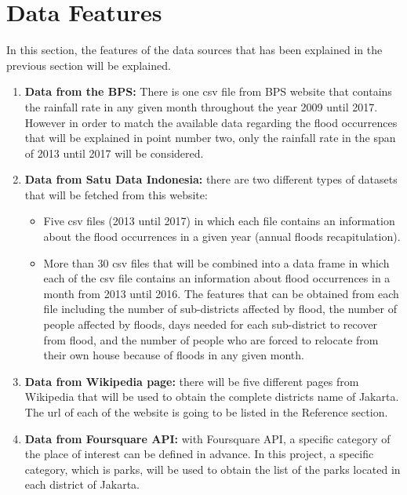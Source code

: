 \section{Data Features}
In this section, the features of the data sources that has been explained in the previous section will be explained.
\begin{enumerate}
\item \textbf{Data from the BPS:} There is one csv file from BPS website that contains the rainfall rate in any given month throughout the year 2009 until 2017. However in order to match the available data regarding the flood occurrences that will be explained in point number two, only the rainfall rate in the span of 2013 until 2017 will be considered.
\item  \textbf{Data from Satu Data Indonesia:} there are two different types of datasets that will be fetched from this website:

\begin{itemize}
\item Five csv files (2013 until 2017) in which each file contains an information about the flood occurrences in a given year (annual floods recapitulation).
\item More than 30 csv files that will be combined into a data frame in which each of the csv file contains an information about flood occurrences in a month from 2013 until 2016. The features that can be obtained from each file including the number of sub-districts affected by flood, the number of people affected by floods, days needed for each sub-district to recover from flood, and the number of people who are forced to relocate from their own house because of floods in any given month.
\end{itemize}
\item \textbf{Data from Wikipedia page:} there will be five different pages from Wikipedia that will be used to obtain the complete districts name of Jakarta. The url of each of the website is going to be listed in the Reference section.
\item \textbf{Data from Foursquare API:} with Foursquare API, a specific category of the place of interest can be defined in advance. In this project, a specific category, which is parks, will be used to obtain the list of the parks located in each district of Jakarta.
\end{enumerate}